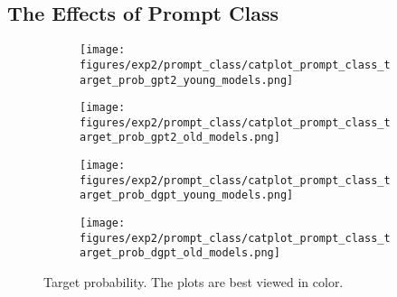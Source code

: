 

\subsection{The Effects of Prompt Class }
\label{subsec:ctg_anal_prompt_class}

\begin{figure}[H]
     \centering
     \begin{subfigure}[b]{0.48\textwidth}
        \centering
        \texttt{[image: figures/exp2/prompt\_class/catplot\_prompt\_class\_target\_prob\_gpt2\_young\_models.png]}
        \caption{}
        \label{subfig:catplot_prompt_class_target_prob_gpt2_young}
     \end{subfigure}
     \quad
     \begin{subfigure}[b]{0.48\textwidth}
        \centering
        \texttt{[image: figures/exp2/prompt\_class/catplot\_prompt\_class\_target\_prob\_gpt2\_old\_models.png]}
        \caption{}
        \label{subfig:catplot_prompt_class_target_prob_gpt2_old}
     \end{subfigure}
    \medskip
    \begin{subfigure}[b]{0.48\textwidth}
        \centering
        \texttt{[image: figures/exp2/prompt\_class/catplot\_prompt\_class\_target\_prob\_dgpt\_young\_models.png]}
        \caption{}
        \label{subfig:catplot_prompt_class_target_prob_dgpt_young}
     \end{subfigure}
    \quad
     \begin{subfigure}[b]{0.48\textwidth}
        \centering
        \texttt{[image: figures/exp2/prompt\_class/catplot\_prompt\_class\_target\_prob\_dgpt\_old\_models.png]}
        \caption{}
        \label{subfig:catplot_prompt_class_target_prob_dgpt_old}
     \end{subfigure}
    \caption{Target probability. The plots are best viewed in color. }
    \label{fig:catplot_prompt_class_target_prob}
\end{figure}

